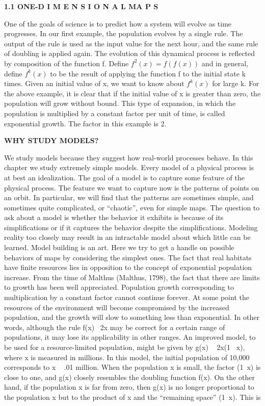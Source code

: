 \documentclass{article}
\begin{document}
\hfill

\textbf{1.1 ONE-D I M E N S I O N A L MA P S}

\hfill

One of the goals of science is to predict how a system will evolve as time progresses.
In our first example, the population evolves by a single rule. The output of the
rule is used as the input value for the next hour, and the same rule of doubling is
applied again. The evolution of this dynamical process is reflected by composition
of the function f. Define $f^2(x)= f(f(x))$ and in general, define $f^k(x)$ to be the
result of applying the function f to the initial state k times. Given an initial
value of x, we want to know about $f^k(x)$ for large k. For the above example, it is
clear that if the initial value of x is greater than zero, the population will grow
without bound. This type of expansion, in which the population is multiplied by
a constant factor per unit of time, is called exponential growth. The factor in this
example is 2.

\hfiill

\textbf{WHY STUDY MODELS?}

\hfill

We study models because they suggest how real-world processes behave.
In this chapter we study extremely simple models.
Every model of a physical process is at best an idealization. The goal
of a model is to capture some feature of the physical process. The
feature we want to capture now is the patterns of points on an orbit.
In particular, we will find that the patterns are sometimes simple, and
sometimes quite complicated, or “chaotic”, even for simple maps.
The question to ask about a model is whether the behavior it exhibits
is because of its simplifications or if it captures the behavior despite
the simplifications. Modeling reality too closely may result in an
intractable model about which little can be learned. Model building
is an art. Here we try to get a handle on possible behaviors of maps
by considering the simplest ones.
The fact that real habitats have finite resources lies in opposition to the
concept of exponential population increase. From the time of Malthus (Malthus,
1798), the fact that there are limits to growth has been well appreciated. Population
growth corresponding to multiplication by a constant factor cannot continue
forever. At some point the resources of the environment will become compromised
by the increased population, and the growth will slow to something less
than exponential.
In other words, although the rule f(x)  2x may be correct for a certain range
of populations, it may lose its applicability in other ranges. An improved model,
to be used for a resource-limited population, might be given by g(x)   2x(1  x),
where x is measured in millions. In this model, the initial population of 10,000
corresponds to x   .01 million. When the population x is small, the factor (1 x)
is close to one, and g(x) closely resembles the doubling function f(x). On the other
hand, if the population x is far from zero, then g(x) is no longer proportional to
the population x but to the product of x and the “remaining space” (1 x). This is
\end{document}

